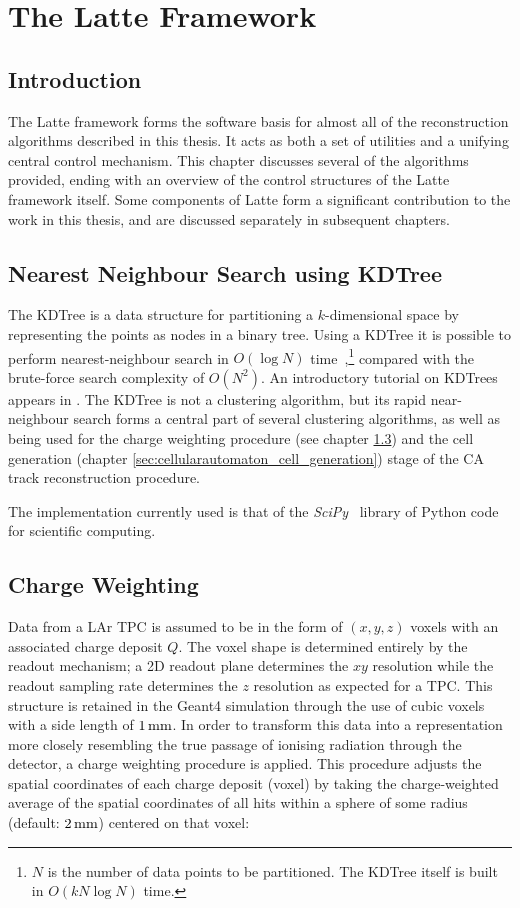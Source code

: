 \chapter{The Latte Framework}\label{chapter:Latte}

\section{Introduction}
The Latte framework forms the software basis for almost all of the reconstruction algorithms described in this thesis. It acts as both a set of utilities and a unifying central control mechanism. This chapter discusses several of the algorithms provided, ending with an overview of the control structures of the Latte framework itself. Some components of Latte form a significant contribution to the work in this thesis, and are discussed separately in subsequent chapters.

\section{Nearest Neighbour Search using \acs{KDTree}}\label{sec:latte_kdtree}
The \ac{KDTree} is a data structure for partitioning a $k$-dimensional space by representing the points as nodes in a binary tree. Using a \ac{KDTree} it is possible to perform nearest-neighbour search in $O(\log N)$ time~\citep{Bentley1975},\footnote{$N$ is the number of data points to be partitioned. The KDTree itself is built in $O(kN\log N)$ time.} compared with the brute-force search complexity of $O(N^2)$. An introductory tutorial on \aclp{KDTree} appears in \citep{Moore1991}. The \ac{KDTree} is not a clustering algorithm, but its rapid near-neighbour search forms a central part of several clustering algorithms, as well as being used for the charge weighting procedure (see chapter \ref{sec:cellularautomaton_charge_weighting}) and the cell generation (chapter \ref{sec:cellularautomaton_cell_generation}) stage of the \acl{CA} track reconstruction procedure.

The implementation currently used is that of the \emph{SciPy}~\citep{SciPy} library of Python code for scientific computing.

\section{Charge Weighting}\label{sec:cellularautomaton_charge_weighting}
Data from a \ac{LAr TPC} is assumed to be in the form of $(x, y, z)$ voxels with an associated charge deposit $Q$. The voxel shape is determined entirely by the readout mechanism; a 2D readout plane determines the $xy$ resolution while the readout sampling rate determines the $z$ resolution as expected for a \ac{TPC}. This structure is retained in the Geant4 simulation through the use of cubic voxels with a side length of $1\,\mathrm{mm}$. In order to transform this data into a representation more closely resembling the true passage of ionising radiation through the detector, a charge weighting procedure is applied. This procedure adjusts the spatial coordinates of each charge deposit (voxel) by taking the charge-weighted average of the spatial coordinates of all hits within a sphere of some radius (default: $2\,\mathrm{mm}$) centered on that voxel:

